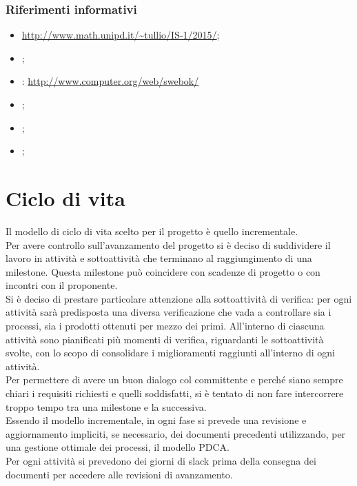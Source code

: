 \documentclass[a4paper, titlepage]{article}
\begin{document}
	\subsubsection{Riferimenti informativi}
	\begin{itemize}
		\item {} \url{http://www.math.unipd.it/~tullio/IS-1/2015/};
		\item {};
		\item {}: \url {http://www.computer.org/web/swebok/}
		\item {} ;
		\item {} ;
		\item {} ;	
	\end{itemize}
	
	\newpage
	\section{Ciclo di vita}\label{Ciclo di vita}
	Il modello di ciclo di vita scelto per il progetto è quello incrementale.\\
	Per avere controllo sull'avanzamento del progetto si è deciso di suddividere il lavoro in attività e sottoattività che terminano al raggiungimento di una milestone. Questa milestone può coincidere con scadenze di progetto o con incontri con il proponente.\\
	Si è deciso di prestare particolare attenzione alla sottoattività di verifica: per ogni attività sarà predisposta una diversa verificazione che vada a controllare sia i processi, sia i prodotti ottenuti per mezzo dei primi. All’interno di ciascuna attività sono pianificati più momenti di verifica, riguardanti le sottoattività svolte, con lo scopo di consolidare i miglioramenti raggiunti all'interno di ogni attività.\\
	Per permettere di avere un buon dialogo col committente e perché siano sempre chiari i requisiti richiesti e quelli soddisfatti, si è tentato di non fare intercorrere troppo tempo tra una milestone e la successiva.\\
	Essendo il modello incrementale, in ogni fase si prevede una revisione e aggiornamento impliciti, se necessario, dei documenti precedenti utilizzando, per una gestione ottimale dei processi, il modello PDCA.\\
	Per ogni attività si prevedono dei giorni di slack prima della consegna dei documenti per accedere alle revisioni di avanzamento.
	
\end{document}
